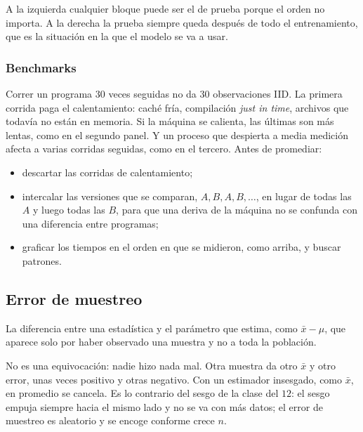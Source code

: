 \documentclass[11pt,letterpaper]{article}
\begin{document}
A la izquierda cualquier bloque puede ser el de prueba porque el orden
no importa. A la derecha la prueba siempre queda después de todo el
entrenamiento, que es la situación en la que el modelo se va a usar.

\subsubsection*{Benchmarks}

Correr un programa $30$ veces seguidas no da $30$ observaciones IID.
La primera corrida paga el calentamiento: caché fría, compilación
\emph{just in time}, archivos que todavía no están en memoria. Si la
máquina se calienta, las últimas son más lentas, como en el segundo
panel. Y un proceso que despierta a media medición afecta a varias
corridas seguidas, como en el tercero. Antes de promediar:

\begin{itemize}[itemsep=0.3em]
    \item descartar las corridas de calentamiento;
    \item intercalar las versiones que se comparan, $A, B, A, B, \ldots$,
          en lugar de todas las $A$ y luego todas las $B$, para que una
          deriva de la máquina no se confunda con una diferencia entre
          programas;
    \item graficar los tiempos en el orden en que se midieron, como
          arriba, y buscar patrones.
\end{itemize}


\subsection*{Error de muestreo}

\begin{definicion}
    La diferencia entre una estadística y el parámetro que estima,
    como $\bar{x} - \mu$, que aparece solo por haber observado una
    muestra y no a toda la población.
\end{definicion}

No es una equivocación: nadie hizo nada mal. Otra muestra da otro
$\bar{x}$ y otro error, unas veces positivo y otras negativo. Con un
estimador insesgado, como $\bar{x}$, en promedio se cancela. Es lo
contrario del sesgo de la clase del $12$: el sesgo empuja
siempre hacia el mismo lado y no se va con más datos; el error de
muestreo es aleatorio y se encoge conforme crece $n$.
\end{document}
